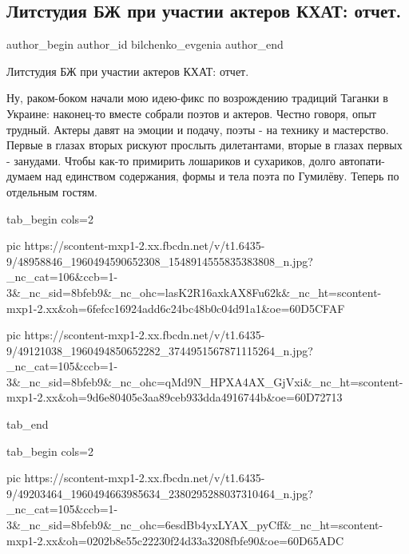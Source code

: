  
 
 
 
 
 
\subsection{Литстудия БЖ при участии актеров КХАТ: отчет.}
\label{sec:29_12_2018.fb.bilchenko_evgenia.1.litstudia_khat}
\ifcmt
 author_begin
   author_id bilchenko_evgenia
 author_end
\fi

Литстудия БЖ при участии актеров КХАТ: отчет.

Ну, раком-боком начали мою идею-фикс по возрождению традиций Таганки в Украине:
наконец-то вместе собрали поэтов и актеров. Честно говоря, опыт трудный. Актеры
давят на эмоции и подачу, поэты - на технику и мастерство. Первые в глазах
вторых рискуют прослыть дилетантами, вторые в глазах первых - занудами. Чтобы
как-то примирить лошариков и сухариков, долго автопати-думаем над единством
содержания, формы и тела поэта по Гумилёву. Теперь по отдельным гостям.

\ifcmt
  tab_begin cols=2

     pic https://scontent-mxp1-2.xx.fbcdn.net/v/t1.6435-9/48958846_1960494590652308_1548914555835383808_n.jpg?_nc_cat=106&ccb=1-3&_nc_sid=8bfeb9&_nc_ohc=lasK2R16axkAX8Fu62k&_nc_ht=scontent-mxp1-2.xx&oh=6fefcc16924add6c24bc48b0c04d91a1&oe=60D5CFAF

     pic https://scontent-mxp1-2.xx.fbcdn.net/v/t1.6435-9/49121038_1960494850652282_3744951567871115264_n.jpg?_nc_cat=105&ccb=1-3&_nc_sid=8bfeb9&_nc_ohc=qMd9N_HPXA4AX_GjVxi&_nc_ht=scontent-mxp1-2.xx&oh=9d6e80405e3aa89ceb933dda4916744b&oe=60D72713

  tab_end
\fi

\ifcmt
  tab_begin cols=2

     pic https://scontent-mxp1-2.xx.fbcdn.net/v/t1.6435-9/49203464_1960494663985634_2380295288037310464_n.jpg?_nc_cat=105&ccb=1-3&_nc_sid=8bfeb9&_nc_ohc=6esdBb4yxLYAX_pyCff&_nc_ht=scontent-mxp1-2.xx&oh=0202b8e55c22230f24d33a3208fbfe90&oe=60D65ADC


